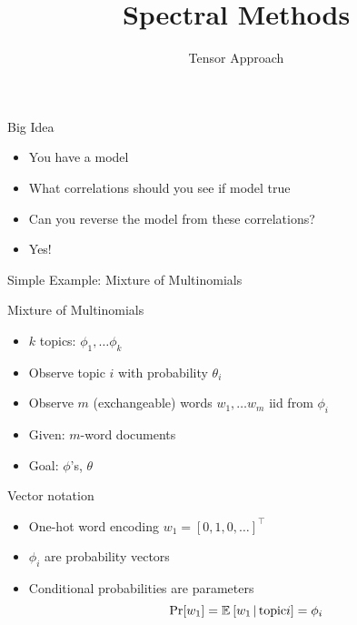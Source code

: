 \documentclass[compress]{beamer}
\title{Spectral Methods}
\date{Tensor Approach}
\begin{document}
\frame{\titlepage
}

\begin{frame}{Big Idea}

  \begin{itemize}
    \item You have a model
    \item What correlations should you see if model true
     \item Can you reverse the model from these correlations?
       \pause
       \item Yes!
  \end{itemize}

\end{frame}

\begin{frame}{Simple Example: Mixture of Multinomials}
  \begin{block}{Mixture of Multinomials}
    \begin{itemize}
      \item $k$ topics: $\phi_1, \dots \phi_k$
        \item Observe topic $i$ with probability $\theta_i$
          \item Observe $m$ (exchangeable) words $w_1, \dots w_m$ iid from $\phi_i$
     \end{itemize}

    \end{block}

     \begin{itemize}
       \item Given: $m$-word documents
       \item Goal: $\phi$'s, $\theta$
     \end{itemize}

\end{frame}

\begin{frame}{Vector notation}

  \begin{itemize}
    \item One-hot word encoding $w_1 = [0, 1, 0, \dots]^\top$
    \item $\phi_i$ are probability vectors
    \item Conditional probabilities are parameters
      \begin{equation}
        \mbox{Pr}[w_1] = \mathbb{E}_{}\left[ w_1 \, | \, \mbox{topic} i \right] = \phi_i
      \end{equation}

  \end{itemize}

\end{frame}
\end{document}
